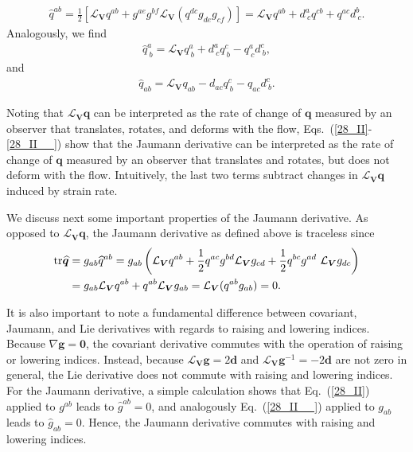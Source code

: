 \begin{align}\label{28_II}
	\widehat{q}^{ab}  =\frac{1}{2}\left[\mathcal{L}_{\bm{V}} q^{ab}  +   g^{ae}g^{bf}\mathcal{L}_{\bm{V}} \left(q^{dc}g_{de}g_{cf}\right) \right] = \mathcal{L}_{\bm{V}} q^{ab} + d^a_{~c} q^{cb}   +  q^{ac} d^b_{~c}. 
\end{align}
Analogously, we find  
\begin{align}\label{28_II_}
	\widehat{q}^a_{~b}  = \mathcal{L}_{\bm{V}} q^a_{~b} +  d^a_{~c} q^c_{~b}  -  q^a_{~c} d^c_{~b}, 
\end{align}
and
\begin{align}\label{28_II__}
	\widehat{q}_{ab}  = \mathcal{L}_{\bm{V}} q_{ab} -  d_{ac} q^c_{~b}  -  q_{ac} d^c_{~b}.
\end{align}

Noting that $\mathcal{L}_{\bm{V}} \bm{q}$  can be interpreted as the rate of change of $\bm{q}$ measured by an observer that translates, rotates, and deforms with the flow, Eqs.~(\ref{28_II}-\ref{28_II__}) show that the Jaumann derivative can be interpreted as the rate of change of $\bm{q}$ measured by an observer that translates and rotates, but does not deform with the flow. Intuitively, the last two terms subtract changes in $\mathcal{L}_{\bm{V}} \bm{q}$ induced by strain rate. 

We discuss next some important properties of the Jaumann derivative. As opposed to $\mathcal{L}_{\bm{V}} \bm{q}$, the Jaumann derivative as defined  above is traceless since 
\begin{align}
	{\rm tr}\widehat{\bm{q}}&=g_{ab}\widehat{q}^{ab}= g_{ab}\left(\mathcal{L}_{\bm{V}} q^{ab} + \frac{1}{2}q^{ac}g^{bd}\mathcal{L}_{\bm{V}} g_{cd} + \frac{1}{2}q^{bc} g^{ad} ~\mathcal{L}_{\bm{V}} g_{dc}\right) \nonumber \\ 
	&=g_{ab}\mathcal{L}_{\bm{V}} q^{ab} + q^{ab} \mathcal{L}_{\bm{V}} g_{ab} = \mathcal{L}_{\bm{V}}(q^{ab} g_{ab}) = 0.
\end{align}

It is also important to note a fundamental difference between covariant, Jaumann, and Lie derivatives with regards to raising and lowering indices. Because $\nabla \bm{g} = \bm{0}$, the covariant derivative commutes with the operation of raising or lowering indices. Instead, because $\mathcal{L}_{\bm{V}} \bm{g}  = 2\bm{d}$ and $\mathcal{L}_{\bm{V}} \bm{g}^{-1}  = -2\bm{d}$ are not zero in general, the Lie derivative does not commute with raising and lowering indices. For the Jaumann derivative, a simple calculation shows that Eq.~(\ref{28_II}) applied to $g^{ab}$ leads to $\widehat{g}^{ab} =0$, and analogously Eq.~(\ref{28_II__}) applied to $g_{ab}$ leads to $\widehat{g}_{ab} =0$. Hence, the Jaumann derivative commutes with raising and lowering indices. 


